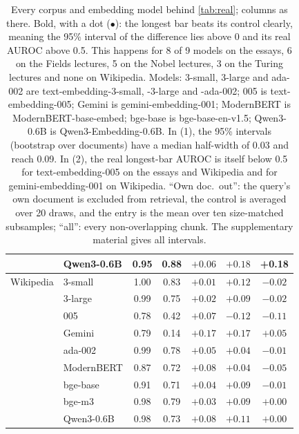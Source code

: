 \begin{table}[h]
\begin{tabular}{llccccc}
 & Qwen3-0.6B & 0.95 & 0.88 & $+0.06$ & $+0.18$ & \textbf{+0.18}\rlap{\,\textcolor[HTML]{D55E00}{$\bullet$}} \\
\midrule
Wikipedia & 3-small & 1.00 & 0.83 & $+0.01$ & $+0.12$ & $-0.02$ \\
 & 3-large & 0.99 & 0.75 & $+0.02$ & $+0.09$ & $-0.02$ \\
 & 005 & 0.78 & 0.42 & $+0.07$ & $-0.12$ & $-0.11$ \\
 & Gemini & 0.79 & 0.14 & $+0.17$ & $+0.17$ & $+0.05$ \\
 & ada-002 & 0.99 & 0.78 & $+0.05$ & $+0.04$ & $-0.01$ \\
 & ModernBERT & 0.87 & 0.72 & $+0.08$ & $+0.04$ & $-0.05$ \\
 & bge-base & 0.91 & 0.71 & $+0.04$ & $+0.09$ & $-0.01$ \\
 & bge-m3 & 0.98 & 0.79 & $+0.03$ & $+0.09$ & $+0.00$ \\
 & Qwen3-0.6B & 0.98 & 0.73 & $+0.08$ & $+0.11$ & $+0.00$ \\
\bottomrule
\end{tabular}
\caption{Every corpus and embedding model behind \cref{tab:real}; columns as there. Bold, with a dot ({\color[HTML]{D55E00}$\bullet$}): the longest bar beats its control clearly, meaning the 95\% interval of the difference lies above 0 and its real AUROC above 0.5. This happens for 8 of 9 models on the essays, 6 on the Fields lectures, 5 on the Nobel lectures, 3 on the Turing lectures and none on Wikipedia. Models: 3-small, 3-large and ada-002 are text-embedding-3-small, -3-large and -ada-002; 005 is text-embedding-005; Gemini is gemini-embedding-001; ModernBERT is ModernBERT-base-embed; bge-base is bge-base-en-v1.5; Qwen3-0.6B is Qwen3-Embedding-0.6B. In (1), the 95\% intervals (bootstrap over documents) have a median half-width of 0.03 and reach 0.09. In (2), the real longest-bar AUROC is itself below 0.5 for text-embedding-005 on the essays and Wikipedia and for gemini-embedding-001 on Wikipedia. ``Own doc.\ out'': the query's own document is excluded from retrieval, the control is averaged over 20 draws, and the entry is the mean over ten size-matched subsamples; ``all'': every non-overlapping chunk. The supplementary material gives all intervals.}
\label{tab:realfull}
\end{table}
